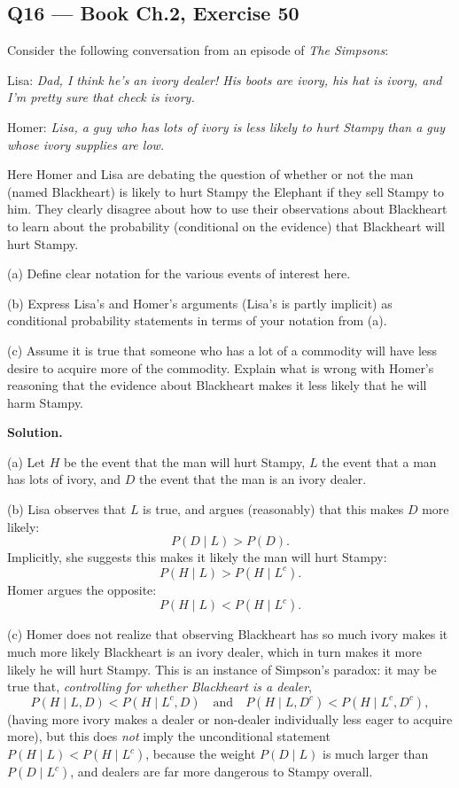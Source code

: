 \documentclass[11pt]{article}
\begin{document}
\subsection*{Q16 --- Book Ch.2, Exercise 50}
\begin{qbox}
Consider the following conversation from an episode of \textit{The Simpsons}:

Lisa: \textit{Dad, I think he's an ivory dealer! His boots are ivory, his hat is ivory, and I'm pretty sure that check is ivory.}

Homer: \textit{Lisa, a guy who has lots of ivory is less likely to hurt Stampy than a guy whose ivory supplies are low.}

Here Homer and Lisa are debating the question of whether or not the man (named Blackheart) is likely to hurt Stampy the Elephant if they sell Stampy to him. They clearly disagree about how to use their observations about Blackheart to learn about the probability (conditional on the evidence) that Blackheart will hurt Stampy.

(a) Define clear notation for the various events of interest here.

(b) Express Lisa's and Homer's arguments (Lisa's is partly implicit) as conditional probability statements in terms of your notation from (a).

(c) Assume it is true that someone who has a lot of a commodity will have less desire to acquire more of the commodity. Explain what is wrong with Homer's reasoning that the evidence about Blackheart makes it less likely that he will harm Stampy.
\end{qbox}
\textbf{Solution.}

(a) Let $H$ be the event that the man will hurt Stampy, $L$ the event that a man has lots of ivory, and $D$ the event that the man is an ivory dealer.

(b) Lisa observes that $L$ is true, and argues (reasonably) that this makes $D$ more likely:
\[
P(D\mid L) > P(D).
\]
Implicitly, she suggests this makes it likely the man will hurt Stampy:
\[
P(H\mid L) > P(H\mid L^c).
\]
Homer argues the opposite:
\[
P(H\mid L) < P(H\mid L^c).
\]

(c) Homer does not realize that observing Blackheart has so much ivory makes it much more likely Blackheart is an ivory dealer, which in turn makes it more likely he will hurt Stampy. This is an instance of Simpson's paradox: it may be true that, \emph{controlling for whether Blackheart is a dealer},
\[
P(H\mid L, D) < P(H\mid L^c, D) \quad \text{and} \quad P(H\mid L, D^c) < P(H\mid L^c, D^c),
\]
(having more ivory makes a dealer or non-dealer individually less eager to acquire more), but this does \emph{not} imply the unconditional statement $P(H\mid L) < P(H\mid L^c)$, because the weight $P(D\mid L)$ is much larger than $P(D\mid L^c)$, and dealers are far more dangerous to Stampy overall.
\end{document}
